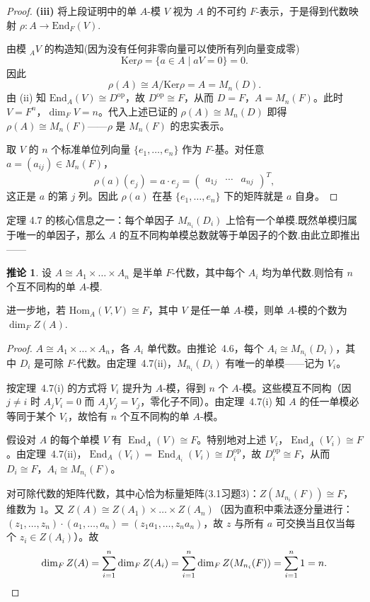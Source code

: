 \documentclass[11pt,a4paper]{article}
\theoremstyle{plain}
\theoremstyle{definition}
\newtheorem{cor}[thm]{推论}
\begin{document}
\begin{proof}
\noindent \textbf{(iii)} 将上段证明中的单 $A$-模 $V$ 视为 $A$ 的不可约 $F$-表示，于是得到代数映射 $\rho : A \to \mathrm{End}_F(V)$.\par
\noindent{} 由模 ${}_A V$ 的构造知(因为没有任何非零向量可以使所有列向量变成零)
$$
\mathrm{Ker}\rho = \{ a \in A \mid aV = 0 \} = 0.
$$
因此
$$
\rho(A) \cong A/\mathrm{Ker}\rho = A = M_n(D).
$$
\noindent{} 由 (ii) 知 $\mathrm{End}_A(V) \cong D^{\mathrm{op}}$，故 $D^{\mathrm{op}} \cong F$，从而 $D = F$，$A = M_n(F)$。此时 $V = F^n$，$\dim_F V = n$。代入上述已证的 $\rho(A) \cong M_n(D)$ 即得 $\rho(A) \cong M_n(F)$——$\rho$ 是 $M_n(F)$ 的忠实表示。

取 $V$ 的 $n$ 个标准单位列向量 $\{e_1,\dots,e_n\}$ 作为 $F$-基。对任意 $a = (a_{ij}) \in M_n(F)$，
\[
\rho(a)(e_j) = a \cdot e_j = \begin{pmatrix} a_{1j} & \cdots & a_{nj} \end{pmatrix}^T,
\]
这正是 $a$ 的第 $j$ 列。因此 $\rho(a)$ 在基 $\{e_1,\dots,e_n\}$ 下的矩阵就是 $a$ 自身。
\end{proof}

\noindent 定理 4.7 的核心信息之一：每个单因子 $M_{n_i}(D_i)$ 上恰有一个单模.既然单模归属于唯一的单因子，那么 $A$ 的互不同构单模总数就等于单因子的个数.由此立即推出——

\begin{cor}
设 $A \cong A_1 \times \dots \times A_n$ 是半单 $F$-代数，其中每个 $A_i$ 均为单代数.则恰有 $n$ 个互不同构的单 $A$-模.

进一步地，若 $\mathrm{Hom}_A(V, V) \cong F$，其中 $V$ 是任一单 $A$-模，则单 $A$-模的个数为 $\dim_F Z(A)$.
\end{cor}

\begin{proof}
\noindent{} $A \cong A_1 \times \dots \times A_n$，各 $A_i$ 单代数。由推论~4.6，每个 $A_i \cong M_{n_i}(D_i)$，其中 $D_i$ 是可除 $F$-代数。由定理~4.7(ii)，$M_{n_i}(D_i)$ 有唯一的单模——记为 $V_i$。

按定理~4.7(i) 的方式将 $V_i$ 提升为 $A$-模，得到 $n$ 个 $A$-模。这些模互不同构（因 $j \neq i$ 时 $A_j V_i = 0$ 而 $A_j V_j = V_j$，零化子不同）。由定理~4.7(i) 知 $A$ 的任一单模必等同于某个 $V_i$，故恰有 $n$ 个互不同构的单 $A$-模。


\noindent{} 假设对 $A$ 的每个单模 $V$ 有 $\operatorname{End}_A(V) \cong F$。特别地对上述 $V_i$，$\operatorname{End}_A(V_i) \cong F$。由定理~4.7(ii)，$\operatorname{End}_A(V_i) = \operatorname{End}_{A_i}(V_i) \cong D_i^{\mathrm{op}}$，故 $D_i^{\mathrm{op}} \cong F$，从而 $D_i \cong F$，$A_i \cong M_{n_i}(F)$。

对可除代数的矩阵代数，其中心恰为标量矩阵(3.1习题3)：$Z(M_{n_i}(F)) \cong F$，维数为 $1$。又 $Z(A) \cong Z(A_1) \times \dots \times Z(A_n)$（因为直积中乘法逐分量进行：$(z_1,\dots,z_n)\cdot(a_1,\dots,a_n)=(z_1a_1,\dots,z_na_n)$，故 $z$ 与所有 $a$ 可交换当且仅当每个 $z_i\in Z(A_i)$）。故
\[
\dim_F Z(A) = \sum_{i=1}^n \dim_F Z(A_i) = \sum_{i=1}^n \dim_F Z(M_{n_i}(F)) = \sum_{i=1}^n 1 = n. \qedhere
\]

\end{proof}
\end{document}
